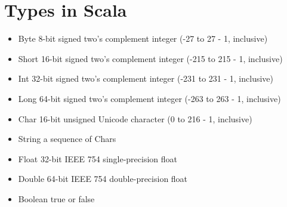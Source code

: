 \documentclass[11pt,a4paper,oneside]{book}
\begin{document}
\chapter{Types in Scala}
\begin{itemize}
\itemsep-3pt
\item  Byte        8-bit signed two's complement integer (-27 to 27 - 1, inclusive)
\item  Short       16-bit signed two's complement integer (-215 to 215 - 1, inclusive)
\item Int         32-bit signed two's complement integer (-231 to 231 - 1, inclusive)        
\item Long        64-bit signed two's complement integer (-263 to 263 - 1, inclusive)
\item Char        16-bit unsigned Unicode character (0 to 216 - 1, inclusive)        
\item String        a sequence of Chars        
\item Float        32-bit IEEE 754 single-precision float
\item Double        64-bit IEEE 754 double-precision float        
\item Boolean        true or false
\end{itemize} 
\end{document}
